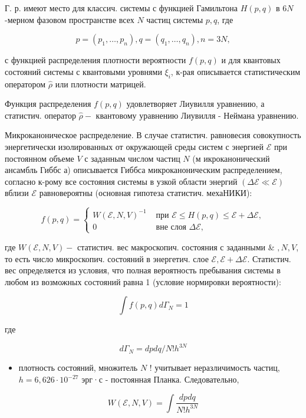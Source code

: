 \documentclass[10pt]{article}
\begin{document}
Г. р. имеют место для классич. системы с функцией Гамильтона $H(p, q)$ в $6 N$-мерном фазовом пространстве всех $N$ частиц системы $p, q$, где



\[

p=\left(p_{1}, \ldots, p_{n}\right), q=\left(q_{1}, \ldots, q_{n}\right), n=3 N,

\]



с функцией распределения плотности вероятности $f(p, q)$ и для квантовых состояний системы с квантовыми уровнями $\xi_{i}$, к-рая описывается статистическим оператором $\hat{\rho}$ или плотности матрицей.



Функция распределения $f(p, q)$ удовлетворяет Лиувилля уравнению, а статистич. оператор $\hat{\rho}-$ квантовому уравнению Лиувилля - Неймана уравнению.



Микроканоническое распределение. В случае статистич. равновесия совокупность энергетически изолированных от окружающей среды систем с энергией $\mathscr{E}$ при постоянном объеме $V$ с заданным числом частиц $N$ (м икроканонический ансамбль Гиббс а) описывается Гиббса микроканоническим распределением, согласно к-рому все состояния системы в узкой области энергий $(\Delta \mathscr{E} \ll \mathscr{E})$ вблизи $\mathscr{E}$ равновероятны (основная гипотеза статистич. мехаНИКИ):



\[

f(p, q)= \begin{cases}W(\mathscr{E}, N, V)^{-1} & \text { при } \mathscr{E} \leqslant H(p, q) \leqslant \mathscr{E}+\Delta \mathscr{E}, \\ 0 & \text { вне слоя } \Delta \mathscr{E},\end{cases}

\]



где $W(\mathscr{E}, N, V)-$ статистич. вес макроскопич. состояния с заданными \& $, N, V$, то есть число микроскопич. состояний в энергетич. слое $\mathscr{E}, \mathscr{E}+\Delta \mathscr{E}$. Статистич. вес определяется из условия, что полная вероятность пребывания системы в любом из возможных состояний равна 1 (условие нормировки вероятности):



\[

\int f(p, q) d \Gamma_{N}=1

\]



где



\[

d \Gamma_{N}=d p d q / N ! h^{3 N}

\]



\begin{itemize}

  \item плотность состояний, множитель $N$ ! учитывает неразличимость частиц, $h=6,626 \cdot 10^{-27}$ эрг·с - постоянная Планка. Следовательно,

\end{itemize}



\[

W(\mathscr{E}, N, V)=\int \frac{d p d q}{N ! h^{3 N}}

\]
\end{document}
